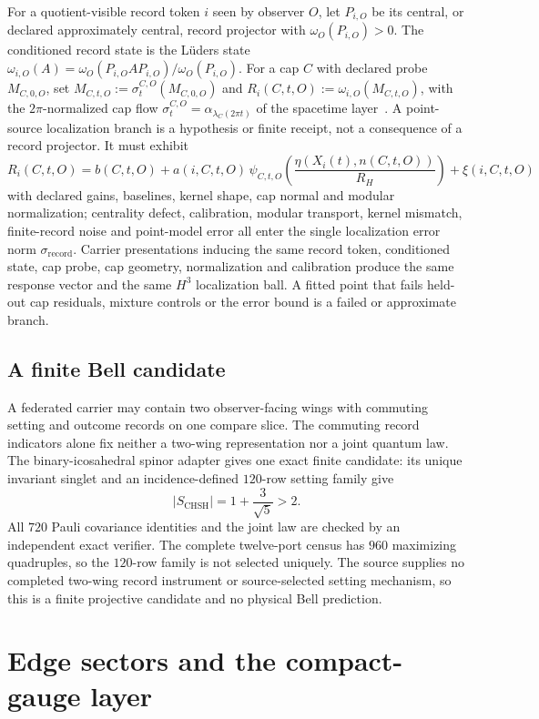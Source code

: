 \documentclass[11pt]{article}
\theoremstyle{remark}
\theoremstyle{plain}
\begin{document}
For a quotient-visible record token \(i\) seen by observer \(O\), let
\(P_{i,O}\) be its central, or declared approximately central, record
projector with \(\omega_O(P_{i,O})>0\). The conditioned record state is the
L\"uders state
\(\omega_{i,O}(A)=\omega_O(P_{i,O}AP_{i,O})/\omega_O(P_{i,O})\). For a cap
\(C\) with declared probe \(M_{C,0,O}\), set
\(M_{C,t,O}:=\sigma_t^{C,O}(M_{C,0,O})\) and
\(R_i(C,t,O):=\omega_{i,O}(M_{C,t,O})\), with the \(2\pi\)-normalized cap
flow \(\sigma_t^{C,O}=\alpha_{\lambda_C(2\pi t)}\) of the spacetime
layer~\cite{ophEinstein}. A point-source localization branch is a hypothesis
or finite receipt, not a consequence of a record projector. It must exhibit
\[
R_i(C,t,O)
=
b(C,t,O)
+a(i,C,t,O)\,
\psi_{C,t,O}\!\left(\frac{\eta(X_i(t),n(C,t,O))}{R_H}\right)
+\xi(i,C,t,O)
\]
with declared gains, baselines, kernel shape, cap normal and modular
normalization; centrality defect, calibration, modular transport, kernel
mismatch, finite-record noise and point-model error all enter the single
localization error norm \(\sigma_{\mathrm{record}}\). Carrier presentations
inducing the same record token, conditioned state, cap probe, cap geometry,
normalization and calibration produce the same response vector and the same
\(H^3\) localization ball. A fitted point that fails held-out cap residuals,
mixture controls or the error bound is a failed or approximate branch.

\subsection{A finite Bell candidate}
A federated carrier may contain two observer-facing wings with commuting
setting and outcome records on one compare slice. The commuting record
indicators alone fix neither a two-wing representation nor a joint quantum
law. The binary-icosahedral spinor adapter gives one exact finite candidate:
its unique invariant singlet and an incidence-defined \(120\)-row setting
family give
\[
\lvert S_{\mathrm{CHSH}}\rvert=1+\frac{3}{\sqrt5}>2.
\]
All \(720\) Pauli covariance identities and the joint law are checked by an
independent exact verifier. The complete twelve-port census has \(960\)
maximizing quadruples, so the \(120\)-row family is not selected uniquely.
The source supplies no completed two-wing record instrument or
source-selected setting mechanism, so this is a finite projective candidate
and no physical Bell prediction.

\section{Edge sectors and the compact-gauge layer}
\label{sec:edge-sectors}
\end{document}
